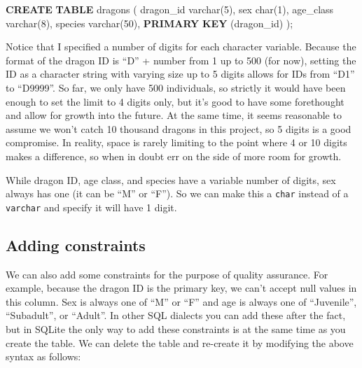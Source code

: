 \documentclass[
]{book}
\newenvironment{Shaded}{\begin{snugshade}}{\end{snugshade}}
\newcommand{\DataTypeTok}[1]{\textcolor[rgb]{0.13,0.29,0.53}{#1}}
\newcommand{\DecValTok}[1]{\textcolor[rgb]{0.00,0.00,0.81}{#1}}
\newcommand{\KeywordTok}[1]{\textcolor[rgb]{0.13,0.29,0.53}{\textbf{#1}}}
\newcommand{\NormalTok}[1]{#1}
\begin{document}
\begin{Shaded}
\begin{Highlighting}[]

\KeywordTok{CREATE} \KeywordTok{TABLE}\NormalTok{ dragons (}
\NormalTok{dragon\_id }\DataTypeTok{varchar}\NormalTok{(}\DecValTok{5}\NormalTok{),}
\NormalTok{sex }\DataTypeTok{char}\NormalTok{(}\DecValTok{1}\NormalTok{),}
\NormalTok{age\_class }\DataTypeTok{varchar}\NormalTok{(}\DecValTok{8}\NormalTok{),}
\NormalTok{species }\DataTypeTok{varchar}\NormalTok{(}\DecValTok{50}\NormalTok{),}
\KeywordTok{PRIMARY} \KeywordTok{KEY}\NormalTok{ (dragon\_id)}
\NormalTok{);}
\end{Highlighting}
\end{Shaded}

Notice that I specified a number of digits for each character variable. Because
the format of the dragon ID is ``D'' + number from 1 up to 500 (for now), setting
the ID as a character string with varying size up to 5 digits allows for IDs
from ``D1'' to ``D9999''. So far, we only have 500 individuals, so strictly it would
have been enough to set the limit to 4 digits only, but it's good to have some
forethought and allow for growth into the future. At the same time, it seems
reasonable to assume we won't catch 10 thousand dragons in this project, so 5
digits is a good compromise. In reality, space is rarely limiting to the
point where 4 or 10 digits makes a difference, so when in doubt err on the side
of more room for growth.

While dragon ID, age class, and species have a variable number of digits, sex
always has one (it can be ``M'' or ``F''). So we can make this a \texttt{char} instead of
a \texttt{varchar} and specify it will have 1 digit.

\hypertarget{adding-constraints}{%
\subsection{Adding constraints}\label{adding-constraints}}

We can also add some constraints for the purpose of quality assurance. For
example, because the dragon ID is the primary key, we can't accept null values
in this column. Sex is always one of ``M'' or ``F'' and age is always one of
``Juvenile'', ``Subadult'', or ``Adult''. In other SQL dialects you can add these
after the fact, but in SQLite the only way to add these constraints is at the
same time as you create the table. We can delete the table and re-create it by
modifying the above syntax as follows:
\end{document}
